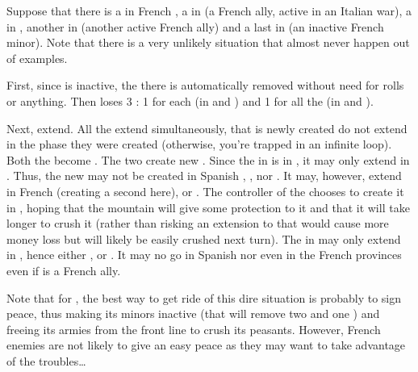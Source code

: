 \begin{exemple}
  Suppose that there is a \REVOLT\Faceplus in French \provinceBearn, a
  \REVOLT\Faceplus in \provinceSavoia (a French ally, active in an Italian
  war), a \REVOLT\Facemoins in \provinceBerry, another in \provincePfalz
  (another active French ally) and a last \REVOLT\Faceplus in
  \provinceLorraine (an inactive French minor). Note that there is a very
  unlikely situation that almost never happen out of examples.

  First, since \paysLorraine is inactive, the \REVOLT there is automatically
  removed without need for rolls or anything. Then \FRA loses 3 \STAB: 1 for
  each \REVOLT\Faceplus (in \provinceBearn and \provinceSavoia) and 1 for all
  the \REVOLT\Facemoins (in \provinceBerry and \provincePfalz).

  Next, \REVOLT extend. All the \REVOLT extend simultaneously, that is newly
  created \REVOLT do not extend in the phase they were created (otherwise,
  you're trapped in an infinite loop). Both the \REVOLT\Facemoins become
  \REVOLT\Faceplus. The two \REVOLT\Faceplus create new
  \REVOLT\Facemoins. Since the \REVOLT\Faceplus in \provinceBearn is in \FRA,
  it may only extend in \FRA. Thus, the new \REVOLT\Facemoins may not be
  created in Spanish \provinceVizcaya, \provinceNavarra, \provincePirineos nor
  \provinceRosselo. It may, however, extend in French \provinceBearn (creating
  a second \REVOLT here), \provinceGuyenne or \provinceLanguedoc. The
  controller of the \REVOLT chooses to create it in \provinceBearn, hoping
  that the mountain will give some protection to it and that it will take
  longer to crush it (rather than risking an extension to \provinceLanguedoc
  that would cause more money loss but will likely be easily crushed next
  turn). The \REVOLT\Faceplus in \provinceSavoia may only extend in
  \paysSavoie, hence either \provinceSavoia, \provinceBresse or
  \provinceNice. It may no go in Spanish \provinceLombardia nor even in the
  French provinces even if \paysSavoie is a French ally.

  \smallskip

  Note that for \FRA, the best way to get ride of this dire situation is
  probably to sign peace, thus making its minors inactive (that will remove
  two \REVOLT\Faceplus and one \REVOLT\Facemoins) and freeing its armies from
  the front line to crush its peasants. However, French enemies are not likely
  to give an easy peace as they may want to take advantage of the
  troubles\ldots
\end{exemple}

